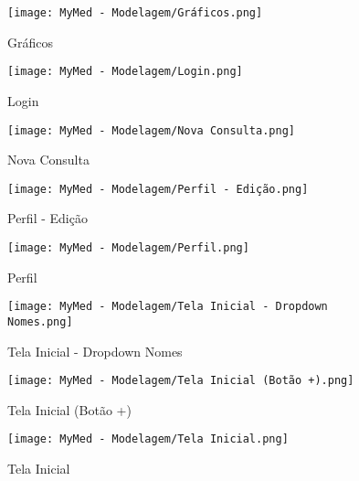 \begin{figure}
	\centering
	\texttt{[image: MyMed - Modelagem/Gráficos.png]}
	\caption{Gráficos}
	\label{graficos}
\end{figure}

\begin{figure}
	\centering
	\texttt{[image: MyMed - Modelagem/Login.png]}
	\caption{Login}
	\label{login}
\end{figure}

\begin{figure}
	\centering
	\texttt{[image: MyMed - Modelagem/Nova Consulta.png]}
	\caption{Nova Consulta}
	\label{nova_consulta}
\end{figure}

\begin{figure}
	\centering
	\texttt{[image: MyMed - Modelagem/Perfil - Edição.png]}
	\caption{Perfil - Edição}
	\label{perfil_edicao}
\end{figure}

\begin{figure}
	\centering
	\texttt{[image: MyMed - Modelagem/Perfil.png]}
	\caption{Perfil}
	\label{perfil}
\end{figure}

\begin{figure}
	\centering
	\texttt{[image: MyMed - Modelagem/Tela Inicial - Dropdown Nomes.png]}
	\caption{Tela Inicial - Dropdown Nomes}
	\label{tela_inicial_dropdown_nomes}
\end{figure}

\begin{figure}
	\centering
	\texttt{[image: MyMed - Modelagem/Tela Inicial (Botão +).png]}
	\caption{Tela Inicial (Botão +)}
	\label{tela_inicial_botao_mais}
\end{figure}

\begin{figure}
	\centering
	\texttt{[image: MyMed - Modelagem/Tela Inicial.png]}
	\caption{Tela Inicial}
	\label{tela_inicial}
\end{figure}
